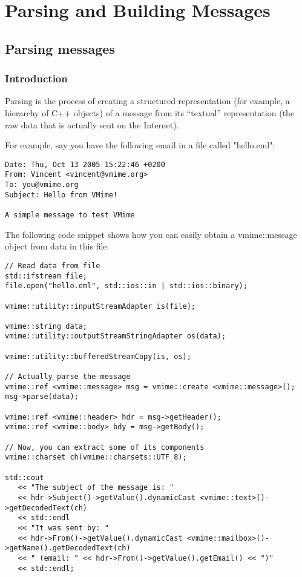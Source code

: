 \chapter{Parsing and Building Messages}

\section{Parsing messages}

\subsection{Introduction} %

Parsing is the process of creating a structured representation (for example,
a hierarchy of C++ objects) of a message from its ``textual'' representation
(the raw data that is actually sent on the Internet).

For example, say you have the following email in a file called "hello.eml":

\begin{verbatim}
Date: Thu, Oct 13 2005 15:22:46 +0200
From: Vincent <vincent@vmime.org>
To: you@vmime.org
Subject: Hello from VMime!

A simple message to test VMime
\end{verbatim}

The following code snippet shows how you can easily obtain a
{\vcode vmime::message} object from data in this file:

\begin{lstlisting}[caption={Parsing a message from a file}]
// Read data from file
std::ifstream file;
file.open("hello.eml", std::ios::in | std::ios::binary);

vmime::utility::inputStreamAdapter is(file);

vmime::string data;
vmime::utility::outputStreamStringAdapter os(data);

vmime::utility::bufferedStreamCopy(is, os);

// Actually parse the message
vmime::ref <vmime::message> msg = vmime::create <vmime::message>();
msg->parse(data);

vmime::ref <vmime::header> hdr = msg->getHeader();
vmime::ref <vmime::body> bdy = msg->getBody();

// Now, you can extract some of its components
vmime::charset ch(vmime::charsets::UTF_8);

std::cout
   << "The subject of the message is: "
   << hdr->Subject()->getValue().dynamicCast <vmime::text>()->getDecodedText(ch)
   << std::endl
   << "It was sent by: "
   << hdr->From()->getValue().dynamicCast <vmime::mailbox>()->getName().getDecodedText(ch)
   << " (email: " << hdr->From()->getValue().getEmail() << ")"
   << std::endl;
\end{lstlisting}

